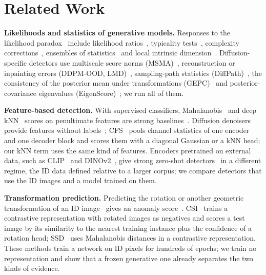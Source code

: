 \documentclass{article}
\begin{document}
\section{Related Work}
\label{sec:related}
\textbf{Likelihoods and statistics of generative models.}
Responses to the likelihood paradox~\cite{nalisnick2019deep} include likelihood ratios~\cite{ren2019lr}, typicality tests~\cite{nalisnick2019typ}, complexity corrections~\cite{serra2020input}, ensembles of statistics~\cite{morningstar2021dose} and local intrinsic dimension~\cite{kamkari2024geometric}. Diffusion-specific detectors use multiscale score norms (MSMA)~\cite{mahmood2021msma}, reconstruction or inpainting errors (DDPM-OOD, LMD)~\cite{graham2023ddpmood,liu2023lmd}, sampling-path statistics (DiffPath)~\cite{heng2024diffpath}, the consistency of the posterior mean under transformations (GEPC)~\cite{alexis2026gepc} and posterior-covariance eigenvalues (EigenScore)~\cite{shoushtari2026eigenscore}; we run all of them.

\textbf{Feature-based detection.}
With supervised classifiers, Mahalanobis~\cite{lee2018maha} and deep kNN~\cite{sun2022knn} scores on penultimate features are strong baselines~\cite{yang2024survey,zhang2023openood}. Diffusion denoisers provide features without labels~\cite{baranchuk2022label,tang2023dift}; CFS~\cite{rouzoumka2026cfs} pools channel statistics of one encoder and one decoder block and scores them with a diagonal Gaussian or a kNN head; our kNN term uses the same kind of features. Encoders pretrained on external data, such as CLIP~\cite{radford2021clip} and DINOv2~\cite{oquab2024dinov2}, give strong zero-shot detectors~\cite{ming2022mcm} in a different regime, the ID data defined relative to a larger corpus; we compare detectors that use the ID images and a model trained on them.

\textbf{Transformation prediction.}
Predicting the rotation or another geometric transformation of an ID image~\cite{gidaris2018rotnet} gives an anomaly score~\cite{golan2018geometric,hendrycks2019ss,bergman2020goad}. CSI~\cite{tack2020csi} trains a contrastive representation with rotated images as negatives and scores a test image by its similarity to the nearest training instance plus the confidence of a rotation head; SSD~\cite{sehwag2021ssd} uses Mahalanobis distances in a contrastive representation. These methods train a network on ID pixels for hundreds of epochs; we train no representation and show that a frozen generative one already separates the two kinds of evidence.
\end{document}
